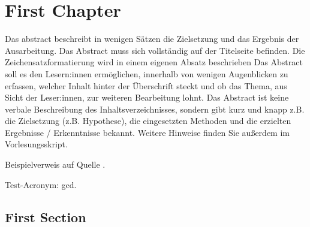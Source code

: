 

\newpage






\iffalse
	\chapter{First Chapter}

	Das \gls{abstract} beschreibt in wenigen Sätzen die Zielsetzung und das Ergebnis der Ausarbeitung. Das Abstract muss sich vollständig auf der Titelseite befinden. Die Zeichensatzformatierung wird in einem eigenen Absatz beschrieben  Das Abstract soll es den Lesern:innen ermöglichen, innerhalb von wenigen Augenblicken zu erfassen, welcher Inhalt hinter der Überschrift steckt und ob das Thema, aus Sicht der Leser:innen, zur weiteren Bearbeitung lohnt. Das Abstract ist keine verbale Beschreibung des Inhaltsverzeichnisses, sondern gibt kurz und knapp z.B. die Zielsetzung (z.B. Hypothese), die eingesetzten Methoden und die erzielten Ergebnisse / Erkenntnisse bekannt. Weitere Hinweise finden Sie außerdem im Vorlesungsskript.

	Beispielverweis auf Quelle \cite{ahrensAbschlussarbeiten}.

	Test-Acronym: \acrshort{gcd}.

	\section{First Section}

